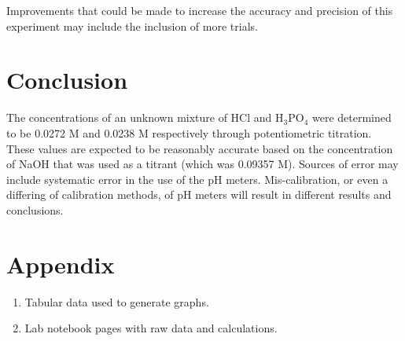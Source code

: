\documentclass{article}
\begin{document}
Improvements that could be made to increase the accuracy and precision of this
experiment may include the inclusion of more trials.


\section {Conclusion}

The concentrations of an unknown mixture of HCl and H$_3$PO$_4$ were determined
to be 0.0272 M and 0.0238 M respectively through potentiometric titration. These
values are expected to be reasonably accurate based on the concentration of NaOH
that was used as a titrant (which was 0.09357 M).  Sources of error may include
systematic error in the use of the pH meters.  Mis-calibration, or even a
differing of calibration methods, of pH meters will result in different results
and conclusions.


\newpage


\newpage

\section*{Appendix}

\begin{enumerate}
        \item Tabular data used to generate graphs.
        \item Lab notebook pages with raw data and calculations.
\end{enumerate}
\end{document}
